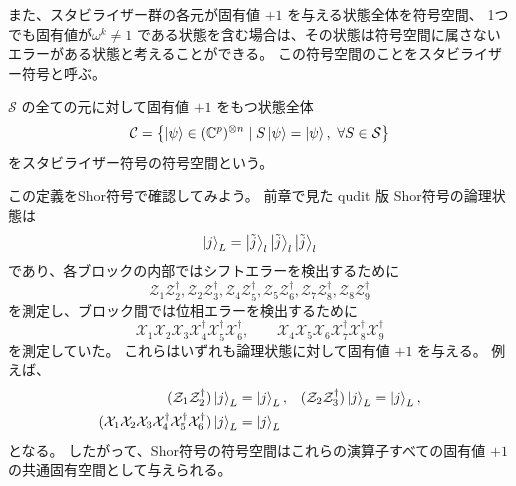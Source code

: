 \documentclass[../master.tex]{subfiles}
\begin{document}
また、スタビライザー群の各元が固有値 $+1$ を与える状態全体を符号空間、
1つでも固有値が$\omega^k \neq 1$ である状態を含む場合は、その状態は符号空間に属さないエラーがある状態と考えることができる。
この符号空間のことをスタビライザー符号と呼ぶ。
\begin{NoteBox}[title={スタビライザー符号}]{}
    $\mathcal{S}$ の全ての元に対して固有値 $+1$ をもつ状態全体
    \begin{equation}
        \mathcal{C}
        =\qty{
            \ket{\psi}\in (\mathbb{C}^p)^{\otimes n}
            \mid S\ket{\psi}=\ket{\psi},\ \forall S\in\mathcal{S}}
    \end{equation}
    をスタビライザー符号の符号空間という。
\end{NoteBox}

この定義をShor符号で確認してみよう。
前章で見た qudit 版 Shor符号の論理状態は
\begin{equation}
    \ket{j}_L = \ket{\tilde{j}}_l \ket{\tilde{j}}_l \ket{\tilde{j}}_l
\end{equation}
であり、各ブロックの内部ではシフトエラーを検出するために
\begin{equation}
    \mathcal{Z}_1\mathcal{Z}_2^\dagger, \mathcal{Z}_2\mathcal{Z}_3^\dagger,
    \mathcal{Z}_4\mathcal{Z}_5^\dagger, \mathcal{Z}_5\mathcal{Z}_6^\dagger,
    \mathcal{Z}_7\mathcal{Z}_8^\dagger, \mathcal{Z}_8\mathcal{Z}_9^\dagger
\end{equation}
を測定し、ブロック間では位相エラーを検出するために
\begin{equation}
    \mathcal{X}_1\mathcal{X}_2\mathcal{X}_3
    \mathcal{X}_4^\dagger\mathcal{X}_5^\dagger\mathcal{X}_6^\dagger,\qquad
    \mathcal{X}_4\mathcal{X}_5\mathcal{X}_6
    \mathcal{X}_7^\dagger\mathcal{X}_8^\dagger\mathcal{X}_9^\dagger
\end{equation}
を測定していた。
これらはいずれも論理状態に対して固有値 $+1$ を与える。
例えば、
\begin{equation}\begin{aligned}[b]
    (\mathcal{Z}_1\mathcal{Z}_2^\dagger)\ket{j}_L &= \ket{j}_L, &
    (\mathcal{Z}_2\mathcal{Z}_3^\dagger)\ket{j}_L &= \ket{j}_L, \\
    (\mathcal{X}_1\mathcal{X}_2\mathcal{X}_3
    \mathcal{X}_4^\dagger\mathcal{X}_5^\dagger\mathcal{X}_6^\dagger)\ket{j}_L &= \ket{j}_L
\end{aligned}\end{equation}
となる。
したがって、Shor符号の符号空間はこれらの演算子すべての固有値 $+1$ の共通固有空間として与えられる。
\end{document}
